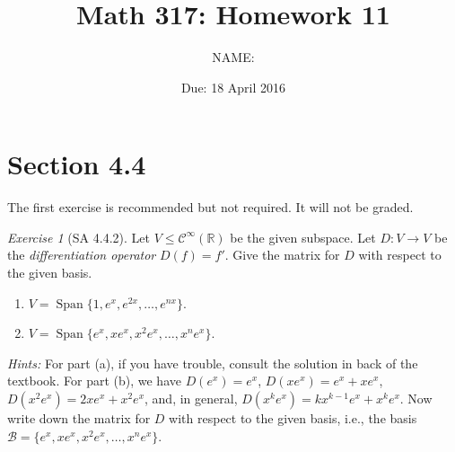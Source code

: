 \documentclass[fleqn,11pt]{paper}
\author {NAME:                     }
\title{Math 317: Homework 11}
\date{Due: 18 April 2016}
\theoremstyle{remark}
\newtheorem*{solution}{{\bf Solution}}
\newtheorem*{ex}{Exercise}
\newcommand\R{\fld{R}}
\newcommand{\<}{\ensuremath{\langle}}
\renewcommand{\>}{\ensuremath{\rangle}}
\newcommand\fld[1]{\ensuremath{\mathbb{#1}}}
\newcommand\sC{\ensuremath{\mathcal C}}
\newcommand\sB{\ensuremath{\mathcal B}}
\newcommand\Span{\ensuremath{\operatorname{Span}}}
\begin{document}
\maketitle

\section*{Section 4.4}
\noindent The first exercise is recommended but not required.  It will not be graded.
\begin{ex}[SA 4.4.2]
  Let $V \leq \sC^\infty(\R)$ be the given subspace.
Let $D : V \to V$ be the \emph{differentiation operator}
$D(f) = f'$. Give the matrix for $D$ with respect to the given basis.
\begin{enumerate}[{\bf a.}]
  \item $V = \Span \{1, e^x, e^{2x}, \dots, e^{nx}\}$.
  \item $V = \Span\{e^x, xe^x, x^2 e^x, \dots, x^n e^x\}$. 
\end{enumerate}
{\it Hints:} For part (a), if you have trouble, consult the solution in back of
  the textbook. For part (b), 
we have $D(e^x) = e^x$, $D(xe^x) = e^x + xe^x$, $D(x^2e^x) = 2xe^x + x^2 e^x$, 
and, in general, $D(x^k e^x) = kx^{k-1} e^x + x^k e^x$.  Now write down the
matrix for $D$ with respect to the given basis, i.e., the basis
$\sB = \{e^x, xe^x, x^2 e^x, \dots, x^n e^x\}$. 
\end{ex}

\newpage
\end{document}

